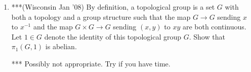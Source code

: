 \documentclass[psamsfonts, 11pt, reqno]{amsart}
\begin{document}
\begin{enumerate}
\vfill



\item ***(Wisconsin Jan '08) By definition, a topological group is a set $G$ with both a topology and a group structure
such that the map $G \rightarrow G$ sending $x$ to $x^{-1}$ and the map $G \times G \rightarrow G$ sending
$(x,y)$ to $xy$ are both continuous.  Let $1 \in G$ denote the identity of this topological group $G$.  Show that
$\pi_1(G,1)$ is abelian.

\vfill

*** Possibly not appropriate.  Try if you have time.
\end{enumerate}
\end{document}
